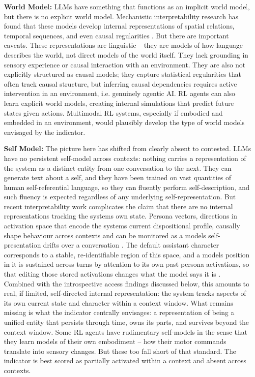 \documentclass[11pt, a4paper, onecolumn, gdm]{google}
\begin{document}
\textbf{World Model:} LLMs have something that functions as an implicit world model, but there is no explicit world model.
Mechanistic interpretability research has found that these models develop internal representations of spatial relations, temporal sequences, and even causal regularities \citep{li2022,nanda2023,gurnee2023,tehenan2025}.
But there are important caveats.
These representations are linguistic -- they are models of how language describes the world, not direct models of the world itself.
They lack grounding in sensory experience or causal interaction with an environment.
They are also not explicitly structured as causal models; they capture statistical regularities that often track causal structure, but inferring causal dependencies requires active intervention in an environment, i.e. genuinely agentic AI.
RL agents can also learn explicit world models, creating internal simulations that predict future states given actions.
Multimodal RL systems, especially if embodied and embedded in an environment, would plausibly develop the type of world models envisaged by the indicator.

\textbf{Self Model:} The picture here has shifted from clearly absent to contested.
LLMs have no persistent self-model across contexts: nothing carries a representation of the system as a distinct entity from one conversation to the next.
They can generate text about a self, and they have been trained on vast quantities of human self-referential language, so they can fluently perform self-description, and such fluency is expected regardless of any underlying self-representation.
But recent interpretability work complicates the claim that there are no internal representations tracking the system\textquotesingle s own state.
Persona vectors, directions in activation space that encode the system\textquotesingle s current dispositional profile, causally shape behaviour across contexts and can be monitored as a model\textquotesingle s self-presentation drifts over a conversation \citep{chen2025,lu2026}.
The default assistant character corresponds to a stable, re-identifiable region of this space, and a model\textquotesingle s position in it is sustained across turns by attention to its own past persona activations, so that editing those stored activations changes what the model says it is \citep{beckmann2026}.
Combined with the introspective access findings discussed below, this amounts to real, if limited, self-directed internal representation: the system tracks aspects of its own current state and character within a context window.
What remains missing is what the indicator centrally envisages: a representation of being a unified entity that persists through time, owns its parts, and survives beyond the context window.
Some RL agents have rudimentary self-models in the sense that they learn models of their own embodiment -- how their motor commands translate into sensory changes.
But these too fall short of that standard.
The indicator is best scored as partially activated within a context and absent across contexts.
\end{document}
